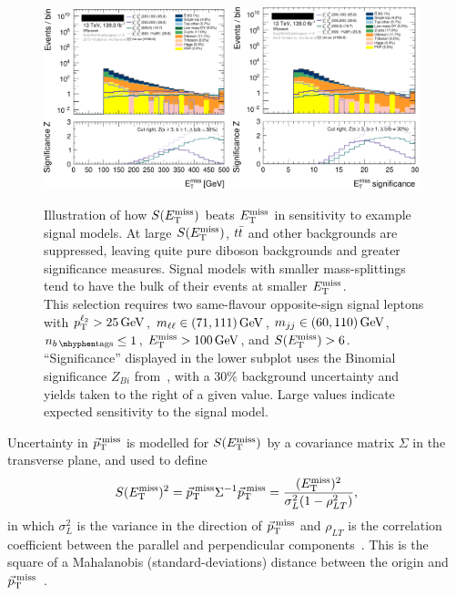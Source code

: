 \begin{figure}[tp]
\centering
\includegraphics[width=0.48\textwidth]{figures/2ljets_presel_met_logy.png}
\hfill
\includegraphics[width=0.48\textwidth]{figures/2ljets_presel_met_sig_logy.png}
\caption[
Illustration of how $\metsig$ beats $\met$ in sensitivity to example signal
models
]{
Illustration of how $\metsig$ beats $\met$ in sensitivity to example signal
models.
At large $\metsig$, $\ttbar$ and other backgrounds are suppressed, leaving
quite pure diboson backgrounds and greater significance measures.
Signal models with smaller mass-splittings tend to have the bulk of their
events at smaller $\met$.
\\[0.5em]
This selection requires two same-flavour opposite-sign signal leptons with
$\pt^{\ell_2} > 25\,\eV[G]$,
$\mll \in (71, 111)\,\eV[G]$,
$\mjj \in (60, 110)\,\eV[G]$,
$\nbtag \leq 1$,
$\met > 100\,\eV[G]$, and
$\metsig > 6$.
\\[0.5em]
``Significance'' displayed in the lower subplot uses the Binomial significance
$Z_{Bi}$ from~\cite{cousins2008evaluation}, with a $30\%$ background
uncertainty and yields taken to the right of a given value.
Large values indicate expected sensitivity to the signal model.
}
\label{fig:2ljets_presel_met}
\end{figure}

Uncertainty in $\ptmiss$ is modelled for $\metsig$ by a covariance matrix
$\Sigma$ in the transverse plane, and used to define
\begin{equation}
\metsig^2
=
\ptmiss \Sigma^{-1} \ptmiss
=
\frac{(\met)^2}{\sigma_L^2(1 - \rho_{LT}^2)}
,
\end{equation}
in which $\sigma_L^2$ is the variance in the direction of $\ptmiss$ and
$\rho_{LT}$ is the correlation coefficient between the parallel and
perpendicular components~\cite{atlas_met_significance}.
This is the square of a Mahalanobis (standard-deviations) distance between
the origin and $\ptmiss$~\cite{mahalanobis1936generalised}.

